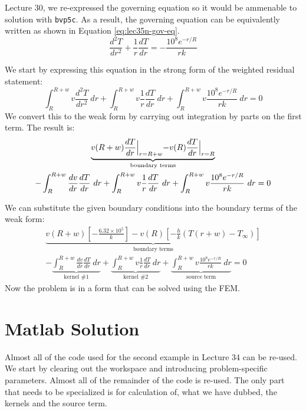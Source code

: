  Lecture 30, we re-expressed the governing equation so it would be ammenable to solution with \lstinline[style=myMatlab]{bvp5c}.  As a result, the governing equation can be equivalently written as shown in Equation \ref{eq:lec35n-gov-eq}.
\begin{equation}
\frac{d^2T}{dr^2}+\frac{1}{r}\frac{dT}{dr} = -\frac{10^8e^{-r/R}}{rk}
\label{eq:lec35n-gov-eq}
\end{equation}

We start by expressing this equation in the strong form of the weighted residual statement:
\begin{equation*}
\int_{R}^{R+w} v \frac{d^2T}{dr^2} \ dr + \int_{R}^{R+w} v \frac{1}{r}\frac{dT}{dr} \ dr + \int_{R}^{R+w} v \frac{10^8e^{-r/R}}{rk} \ dr = 0
\end{equation*}
We convert this to the weak form by carrying out integration by parts on the first term.  The result is:
\begin{multline*}
\underbrace{v(R+w) \frac{dT}{dr}\Bigl|_{r=R+w} - v(R)\frac{dT}{dr}\Bigl|_{r=R}}_{\text{boundary terms}} \\
-\int_{R}^{R+w} \frac{dv}{dr}\frac{dT}{dr} \ dr +  \int_{R}^{R+w} v \frac{1}{r}\frac{dT}{dr} \ dr + \int_{R}^{R+w} v \frac{10^8e^{-r/R}}{rk} \ dr = 0
\end{multline*}

\noindent We can substitute the given boundary conditions into the boundary terms of the weak form:
\begin{multline*}
\underbrace{v(R+w) \left[-\frac{6.32\times 10^5}{k} \right] - v(R)\left[-\frac{h}{k}\left(T(r+w)-T_{\infty}\right) \right]}_{\text{boundary terms}} \\
-\underbrace{\int_{R}^{R+w} \frac{dv}{dr}\frac{dT}{dr} \ dr}_{\text{kernel \#1}} +\underbrace{\int_{R}^{R+w} v \frac{1}{r}\frac{dT}{dr} \ dr}_{\text{kernel \#2}} +\underbrace{\int_{R}^{R+w} v \frac{10^8e^{-r/R}}{rk} \ dr}_{\text{source term}} = 0
\end{multline*}
Now the problem is in a form that can be solved using the FEM.

\section{Matlab Solution}
Almost all of the code used for the second example in Lecture 34 can be re-used.  We start by clearing out the workspace and introducing problem-specific parameters.  Almost all of the remainder of the code is re-used.  The only part that needs to be specialized is for calculation of, what we have dubbed, the kernels and the source term.  



